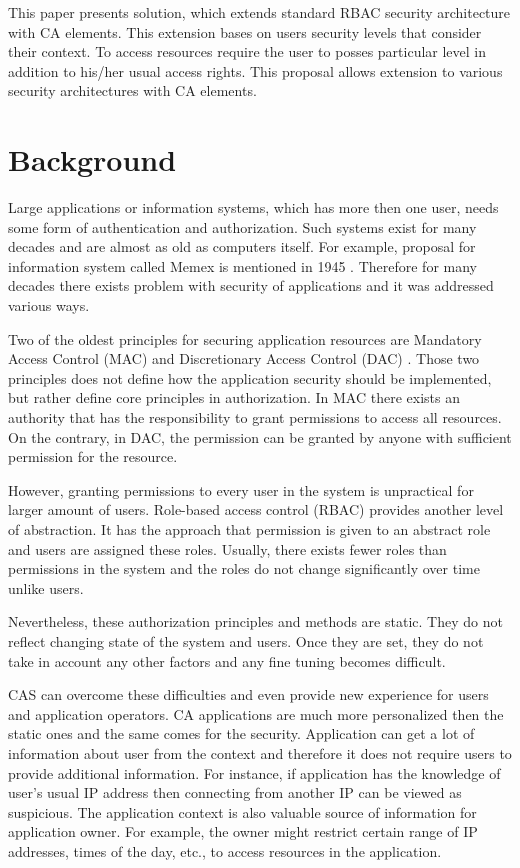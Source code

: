 \documentclass{sig-alternate}
\begin{document}
This paper presents solution, which extends standard RBAC security architecture with CA elements. This extension bases on users security levels that consider their context. To access resources require the user to posses particular level in addition to his/her usual access rights. This proposal allows extension to various security architectures with CA elements.

\section{Background}
Large applications or information systems, which has more then one user, needs some form of authentication and authorization. Such systems exist for many decades and are almost as old as computers itself. For example, proposal for information system called Memex is mentioned in 1945 \cite{memex}. Therefore for many decades there exists problem with security of applications and it was addressed various ways.

Two of the oldest principles for securing application resources are Mandatory Access Control (MAC) \cite{accesscontrol} and Discretionary Access Control (DAC) \cite{accesscontrol}. Those two principles does not define how the application security should be implemented, but rather define core principles in authorization. In MAC there exists an authority that has the responsibility to grant permissions to access all resources. On the contrary, in DAC, the permission can be granted by anyone with sufficient permission for the resource.

However, granting permissions to every user in the system is unpractical for larger amount of users. Role-based access control (RBAC) \cite{rbac} provides another level of abstraction. It has the approach that permission is given to an abstract role and users are assigned these roles. Usually, there exists fewer roles than permissions in the system and the roles do not change significantly over time unlike users.

Nevertheless, these authorization principles and methods are static. They do not reflect changing state of the system and users. Once they are set, they do not take in account any other factors and any fine tuning becomes difficult.

CAS can overcome these difficulties and even provide new experience for users and application operators. CA applications are much more personalized then the static ones and the same comes for the security. Application can get a lot of information about user from the context and therefore it does not require users to provide additional information. For instance, if application has the knowledge of user's usual IP address then connecting from another IP can be viewed as suspicious. The application context is also valuable source of information for application owner. For example, the owner might restrict certain range of IP addresses, times of the day, etc., to access resources in the application. 
\end{document}
